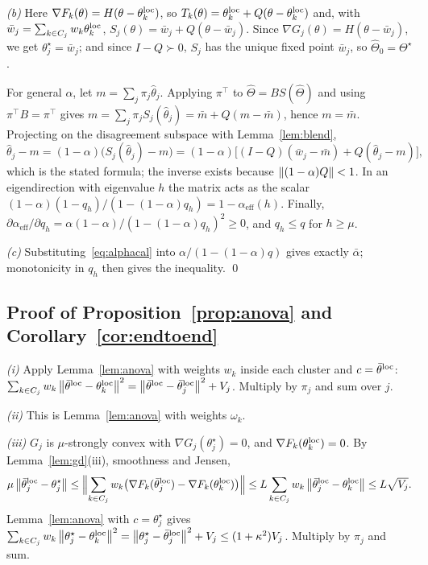 \emph{(b)} Here $\nabla F_k(\theta)=H(\theta-\theta^{\mathrm{loc}}_k)$, so
$T_k(\theta)=\theta_k^{\mathrm{loc}}+Q(\theta-\theta^{\mathrm{loc}}_k)$ and, with
$\bar w_j=\sum_{k\in C_j}w_k\theta_k^{\mathrm{loc}}$, $S_j(\theta)=\bar w_j+Q(\theta-\bar w_j)$. Since
$\nabla G_j(\theta)=H(\theta-\bar w_j)$, we get $\theta_j^\star=\bar w_j$; and since
$I-Q\succ0$, $S_j$ has the unique fixed point $\bar w_j$, so $\hat\Theta_0=\Theta^\star$.

For general $\alpha$, let $m=\sum_j\pi_j\hat\theta_j$. Applying $\pi^\top$ to
$\hat\Theta=BS(\hat\Theta)$ and using $\pi^\top B=\pi^\top$ gives
$m=\sum_j\pi_jS_j(\hat\theta_j)=\bar m+Q(m-\bar m)$, hence $m=\bar m$. Projecting on the
disagreement subspace with Lemma~\ref{lem:blend},
\[
  \hat\theta_j-m=(1-\alpha)\bigl(S_j(\hat\theta_j)-m\bigr)=(1-\alpha)\bigl[(I-Q)(\bar w_j-\bar m)+Q(\hat\theta_j-m)\bigr],
\]
which is the stated formula; the inverse exists because $\left\lVert (1-\alpha)Q \right\rVert<1$. In an
eigendirection with eigenvalue $h$ the matrix acts as the scalar
$(1-\alpha)(1-q_h)/(1-(1-\alpha)q_h)=1-\alpha_{\mathrm{eff}}(h)$. Finally,
$\partial\alpha_{\mathrm{eff}}/\partial q_h=\alpha(1-\alpha)/(1-(1-\alpha)q_h)^2\ge0$, and
$q_h\le q$ for $h\ge\mu$.

\emph{(c)} Substituting~\eqref{eq:alphacal} into $\alpha/(1-(1-\alpha)q)$ gives exactly
$\bar\alpha$; monotonicity in $q_h$ then gives the inequality.
\qed

\subsection{Proof of Proposition~\ref{prop:anova} and Corollary~\ref{cor:endtoend}}
\emph{(i)} Apply Lemma~\ref{lem:anova} with weights $w_k$ inside each cluster and $c=\bar\theta^{\mathrm{loc}}$:
$\sum_{k\in C_j}w_k\left\lVert \bar\theta^{\mathrm{loc}}-\theta_k^{\mathrm{loc}} \right\rVert^2=\left\lVert \bar\theta^{\mathrm{loc}}-\bar\theta^{\mathrm{loc}}_j \right\rVert^2+V_j$.
Multiply by $\pi_j$ and sum over $j$.

\emph{(ii)} This is Lemma~\ref{lem:anova} with weights $\omega_k$.

\emph{(iii)} $G_j$ is $\mu$-strongly convex with $\nabla G_j(\theta_j^\star)=0$, and
$\nabla F_k(\theta_k^{\mathrm{loc}})=0$. By Lemma~\ref{lem:gd}(iii), smoothness and Jensen,
\[
  \mu\left\lVert \bar\theta^{\mathrm{loc}}_j-\theta_j^\star \right\rVert\le\Bigl\|\sum_{k\in C_j}w_k\bigl(\nabla F_k(\bar\theta^{\mathrm{loc}}_j)-\nabla F_k(\theta^{\mathrm{loc}}_k)\bigr)\Bigr\|
  \le L\sum_{k\in C_j}w_k\left\lVert \bar\theta^{\mathrm{loc}}_j-\theta^{\mathrm{loc}}_k \right\rVert\le L\sqrt{V_j}.
\]
Lemma~\ref{lem:anova} with $c=\theta_j^\star$ gives
$\sum_{k\in C_j}w_k\left\lVert \theta_j^\star-\theta_k^{\mathrm{loc}} \right\rVert^2=\left\lVert \theta_j^\star-\bar\theta_j^{\mathrm{loc}} \right\rVert^2+V_j\le(1+\kappa^2)V_j$.
Multiply by $\pi_j$ and sum.

